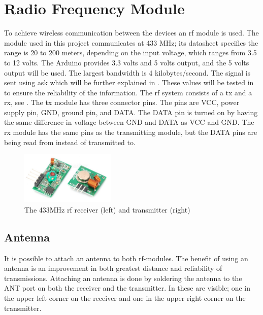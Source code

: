 \section{Radio Frequency Module} \label{rfmodule}
To achieve wireless communication between the devices an \gls{rf} module is used.
The module used in this project communicates at 433 MHz; its datasheet specifies the range is 20 to 200 meters, depending on the input voltage, which ranges from 3.5 to 12 volts. 
The Arduino provides 3.3 volts and 5 volts output, and the 5 volts output will be used.
The largest bandwidth is 4 kilobytes/second. 
The signal is sent using \gls{ask} which will be further explained in .
These values will be tested in  to ensure the reliability of the information. 
\bigskip \noindent
The \gls{rf} system consists of a \gls{tx} and a \gls{rx}, see .
The \gls{tx} module has three connector pins.
The pins are VCC, power supply pin, GND, ground pin, and DATA.
The DATA pin is turned on by having the same difference in voltage between GND and DATA as VCC and GND. 
The \gls{rx} module has the same pins as the transmitting module, but the DATA pins are being read from instead of transmitted to.

\begin{figure}[h] 
\vspace{-5pt} 
\centering
\includegraphics[width=0.4\textwidth]{Figures/arduino_rf.jpg}
\vspace{-5pt} 
\caption{The 433MHz \gls{rf} receiver (left) and transmitter (right)}
\label{fig:arduino_rf}
\vspace{-5pt}    
\end{figure}

\subsection{Antenna}
It is possible to attach an antenna to both \gls{rf}-modules. 
The benefit of using an antenna is an improvement in both greatest distance and reliability of transmissions.
Attaching an antenna is done by soldering the antenna to the ANT port on both the receiver and the transmitter. 
In  these are visible; one in the upper left corner on the receiver and one in the upper right corner on the transmitter. 

